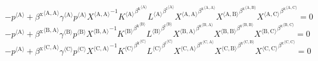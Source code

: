 \begin{equation}
-{p}^{\langle \mathrm{A}\rangle} + {{\beta^{\mathrm{x}}}^{\langle \mathrm{\mathrm{A}},\mathrm{\mathrm{A}}\rangle}} {{\gamma}^{\langle \mathrm{\mathrm{A}}\rangle}} {{p}^{\langle \mathrm{A}\rangle}} {{X}^{\langle \mathrm{A},\mathrm{A}\rangle}}^{-1} {{{K}^{\langle \mathrm{A}\rangle}}^{{\beta^{\mathrm{k}}}^{\langle \mathrm{\mathrm{A}}\rangle}}} {{{L}^{\langle \mathrm{A}\rangle}}^{{\beta^{\mathrm{l}}}^{\langle \mathrm{\mathrm{A}}\rangle}}} {{{X}^{\langle \mathrm{A},\mathrm{A}\rangle}}^{{\beta^{\mathrm{x}}}^{\langle \mathrm{\mathrm{A}},\mathrm{\mathrm{A}}\rangle}}} {{{X}^{\langle \mathrm{A},\mathrm{B}\rangle}}^{{\beta^{\mathrm{x}}}^{\langle \mathrm{\mathrm{A}},\mathrm{\mathrm{B}}\rangle}}} {{{X}^{\langle \mathrm{A},\mathrm{C}\rangle}}^{{\beta^{\mathrm{x}}}^{\langle \mathrm{\mathrm{A}},\mathrm{\mathrm{C}}\rangle}}} = 0
\end{equation}
\begin{equation}
-{p}^{\langle \mathrm{A}\rangle} + {{\beta^{\mathrm{x}}}^{\langle \mathrm{\mathrm{B}},\mathrm{\mathrm{A}}\rangle}} {{\gamma}^{\langle \mathrm{\mathrm{B}}\rangle}} {{p}^{\langle \mathrm{B}\rangle}} {{X}^{\langle \mathrm{B},\mathrm{A}\rangle}}^{-1} {{{K}^{\langle \mathrm{B}\rangle}}^{{\beta^{\mathrm{k}}}^{\langle \mathrm{\mathrm{B}}\rangle}}} {{{L}^{\langle \mathrm{B}\rangle}}^{{\beta^{\mathrm{l}}}^{\langle \mathrm{\mathrm{B}}\rangle}}} {{{X}^{\langle \mathrm{B},\mathrm{A}\rangle}}^{{\beta^{\mathrm{x}}}^{\langle \mathrm{\mathrm{B}},\mathrm{\mathrm{A}}\rangle}}} {{{X}^{\langle \mathrm{B},\mathrm{B}\rangle}}^{{\beta^{\mathrm{x}}}^{\langle \mathrm{\mathrm{B}},\mathrm{\mathrm{B}}\rangle}}} {{{X}^{\langle \mathrm{B},\mathrm{C}\rangle}}^{{\beta^{\mathrm{x}}}^{\langle \mathrm{\mathrm{B}},\mathrm{\mathrm{C}}\rangle}}} = 0
\end{equation}
\begin{equation}
-{p}^{\langle \mathrm{A}\rangle} + {{\beta^{\mathrm{x}}}^{\langle \mathrm{\mathrm{C}},\mathrm{\mathrm{A}}\rangle}} {{\gamma}^{\langle \mathrm{\mathrm{C}}\rangle}} {{p}^{\langle \mathrm{C}\rangle}} {{X}^{\langle \mathrm{C},\mathrm{A}\rangle}}^{-1} {{{K}^{\langle \mathrm{C}\rangle}}^{{\beta^{\mathrm{k}}}^{\langle \mathrm{\mathrm{C}}\rangle}}} {{{L}^{\langle \mathrm{C}\rangle}}^{{\beta^{\mathrm{l}}}^{\langle \mathrm{\mathrm{C}}\rangle}}} {{{X}^{\langle \mathrm{C},\mathrm{A}\rangle}}^{{\beta^{\mathrm{x}}}^{\langle \mathrm{\mathrm{C}},\mathrm{\mathrm{A}}\rangle}}} {{{X}^{\langle \mathrm{C},\mathrm{B}\rangle}}^{{\beta^{\mathrm{x}}}^{\langle \mathrm{\mathrm{C}},\mathrm{\mathrm{B}}\rangle}}} {{{X}^{\langle \mathrm{C},\mathrm{C}\rangle}}^{{\beta^{\mathrm{x}}}^{\langle \mathrm{\mathrm{C}},\mathrm{\mathrm{C}}\rangle}}} = 0
\end{equation}
